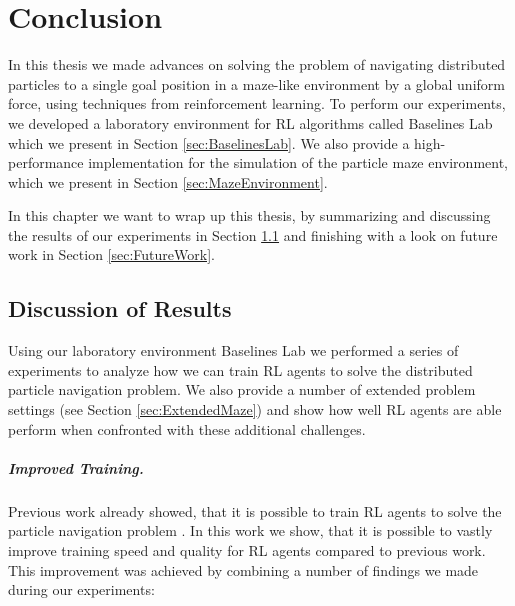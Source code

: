 \chapter{Conclusion}
In this thesis we made advances on solving the problem of navigating distributed particles to a single goal position in a maze-like environment by a global uniform force, using techniques from reinforcement learning. To perform our experiments, we developed a laboratory environment for RL algorithms called Baselines Lab which we present in Section \ref{sec:BaselinesLab}. We also provide a high-performance implementation for the simulation of the particle maze environment, which we present in Section \ref{sec:MazeEnvironment}.  

In this chapter we want to wrap up this thesis, by summarizing and discussing the results of our experiments in Section \ref{sec:EvalDiscussion} and finishing with a look on future work in Section \ref{sec:FutureWork}.

\section{Discussion of Results} \label{sec:EvalDiscussion}
Using our laboratory environment Baselines Lab we performed a series of experiments to analyze how we can train RL agents to solve the distributed particle navigation problem. We also provide a number of extended problem settings (see Section \ref{sec:ExtendedMaze}) and show how well RL agents are able perform when confronted with these additional challenges.

\paragraph{Improved Training.}
Previous work already showed, that it is possible to train RL agents to solve the particle navigation problem \cite{huang2019,becker2020}. In this work we show, that it is possible to vastly improve training speed and quality for RL agents compared to previous work. This improvement was achieved by combining a number of findings we made during our experiments:

